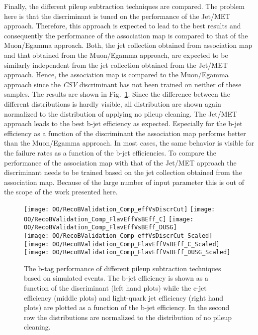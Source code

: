 Finally, the different pileup subtraction techniques are compared. The problem here is that the discriminant is tuned on the performance of the Jet/MET approach. Therefore, this approach is expected to lead to the best results and consequently the performance of the association map is compared to that of the Muon/Egamma approach. Both, the jet collection obtained from association map and that obtained from the Muon/Egamma approach, are expected to be similarly independent from the jet collection obtained from the Jet/MET approach. Hence, the association map is compared to the Muon/Egamma approach since the \textit{CSV} discriminant has not been trained on neither of these samples. The results are shown in Fig.~\ref{plot:OOBTaggingComp}. Since the difference between the different distributions is hardly visible, all distribution are shown again normalized to the distribution of applying no pileup cleaning. The Jet/MET approach leads to the best b-jet efficiency as expected. Especially for the b-jet efficiency as a function of the discriminant the association map performs better than the Muon/Egamma approach. In most cases, the same behavior is visible for the failure rates as a function of the b-jet efficiencies. To compare the performance of the association map with that of the Jet/MET approach the discriminant needs to be trained based on the jet collection obtained from the association map. Because of the large number of input parameter this is out of the scope of the work presented here. 

\begin{figure}[h!t]
  \centering
  \texttt{[image: OO/RecoBValidation\_Comp\_effVsDiscrCut]}
  \texttt{[image: OO/RecoBValidation\_Comp\_FlavEffVsBEff\_C]}
  \texttt{[image: OO/RecoBValidation\_Comp\_FlavEffVsBEff\_DUSG]}
  \\
  \texttt{[image: OO/RecoBValidation\_Comp\_effVsDiscrCut\_Scaled]}
  \texttt{[image: OO/RecoBValidation\_Comp\_FlavEffVsBEff\_C\_Scaled]}
  \texttt{[image: OO/RecoBValidation\_Comp\_FlavEffVsBEff\_DUSG\_Scaled]}
  \caption[B tag performance of different pileup subtraction techniques based on simulated \ttbar events]{The b-tag performance of different pileup subtraction techniques based on simulated \ttbar events. The b-jet efficiency is shown as a function of the discriminant (left hand plots) while the c-jet efficiency (middle plots) and light-quark jet efficiency (right hand plots) are plotted as a function of the b-jet efficiency. In the second row the distributions are normalized to the distribution of no pileup cleaning. \label{plot:OOBTaggingComp}}
\end{figure}

